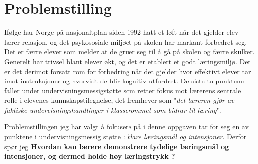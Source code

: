 \documentclass[main.tex]{subfiles}
\begin{document}
\section*{Problemstilling}
Ifølge  har Norge på nasjonaltplan siden 1992 hatt et løft når det gjelder elev-lærer 
relasjon, og det psykososiale miljøet på skolen har markant forbedret seg. Det er færre elever 
som melder at de gruer seg til å gå på skolen og færre skulker. Generelt har trivsel 
blant elever økt, og det er etablert et godt læringsmiljø. Det er det derimot 
forsatt rom for forbedring når det gjelder hvor effektivt elever tar imot instruksjoner og hvorvidt 
de blir kognitiv utfordret. De siste to punktene faller under undervisningsmessigstøtte som retter 
fokus mot lærerens sentrale rolle i elevenes kunnskapstilegnelse, det  fremhever som 
"\emph{det læreren gjør av faktiske undervisningshandlinger i klasserommet som bidrar til læring}".

Problemstillingen jeg har valgt å fokusere på i denne oppgaven tar for seg en av punktene i
undervisningsmessig støtte : \emph{klare læringsmål og intensjoner}. Derfor spør jeg 
\newline
\newline
\textbf{Hvordan kan lærere demonstrere tydelige læringsmål og intensjoner, og dermed holde høy
læringstrykk ?}
\newline
\end{document}
